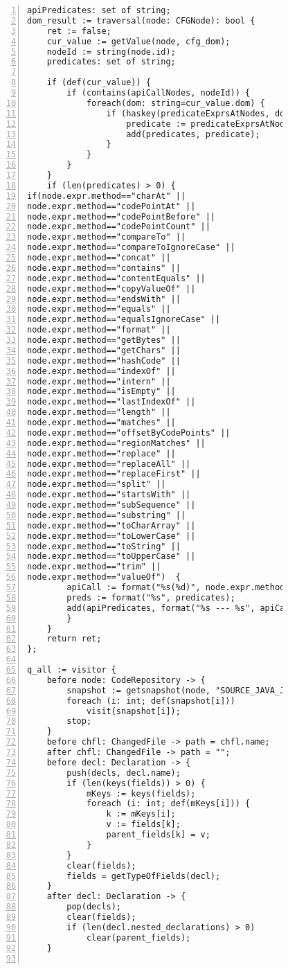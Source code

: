 \begin{figure}[ht!]
\begin{lstlisting}[numbers=left, tabsize=4, escapechar=@, caption={API Precondition Mining Analysis},label={lst:apm-code}, lastline = 10]
apiPredicates: set of string;
dom_result := traversal(node: CFGNode): bool {
    ret := false;
	cur_value := getValue(node, cfg_dom);
	nodeId := string(node.id);
	predicates: set of string;
	
	if (def(cur_value)) {
		if (contains(apiCallNodes, nodeId)) {
			foreach(dom: string=cur_value.dom) {
				if (haskey(predicateExprsAtNodes, dom)) {
					predicate := predicateExprsAtNodes[dom];
					add(predicates, predicate);
				}
			}
		}
	}
	if (len(predicates) > 0) {
if(node.expr.method=="charAt" ||  
node.expr.method=="codePointAt" || 
node.expr.method=="codePointBefore" || 
node.expr.method=="codePointCount" || 
node.expr.method=="compareTo" || 
node.expr.method=="compareToIgnoreCase" || 
node.expr.method=="concat" || 
node.expr.method=="contains" || 
node.expr.method=="contentEquals" || 
node.expr.method=="copyValueOf" || 
node.expr.method=="endsWith" || 
node.expr.method=="equals" || 
node.expr.method=="equalsIgnoreCase" || 
node.expr.method=="format" || 
node.expr.method=="getBytes" || 
node.expr.method=="getChars" || 
node.expr.method=="hashCode" || 
node.expr.method=="indexOf" || 
node.expr.method=="intern" || 
node.expr.method=="isEmpty" || 
node.expr.method=="lastIndexOf" || 
node.expr.method=="length" || 
node.expr.method=="matches" || 
node.expr.method=="offsetByCodePoints" || 
node.expr.method=="regionMatches" || 
node.expr.method=="replace" || 
node.expr.method=="replaceAll" || 
node.expr.method=="replaceFirst" || 
node.expr.method=="split" ||  
node.expr.method=="startsWith" ||  
node.expr.method=="subSequence" || 
node.expr.method=="substring" || 
node.expr.method=="toCharArray" || 
node.expr.method=="toLowerCase" || 
node.expr.method=="toString" || 
node.expr.method=="toUpperCase" || 
node.expr.method=="trim" || 
node.expr.method=="valueOf")  {
	    apiCall := format("%s(%d)", node.expr.method, len(node.expr.method_args));
	    preds := format("%s", predicates);
	    add(apiPredicates, format("%s --- %s", apiCall, preds));
	    }
	}
	return ret;
};

q_all := visitor {
	before node: CodeRepository -> {
		snapshot := getsnapshot(node, "SOURCE_JAVA_JLS");
		foreach (i: int; def(snapshot[i]))
			visit(snapshot[i]);
		stop;
	}
	before chfl: ChangedFile -> path = chfl.name;
	after chfl: ChangedFile -> path = "";
	before decl: Declaration -> {
	    push(decls, decl.name);
	    if (len(keys(fields)) > 0) {
	        mKeys := keys(fields);    
	        foreach (i: int; def(mKeys[i])) {
	        	k := mKeys[i];
	        	v := fields[k];
	            parent_fields[k] = v;
	        }
	    }
	    clear(fields);
	    fields = getTypeOfFields(decl);
	}
    after decl: Declaration -> {
        pop(decls);
        clear(fields);
        if (len(decl.nested_declarations) > 0)
            clear(parent_fields);
    }


\end{lstlisting}
\end{figure}
